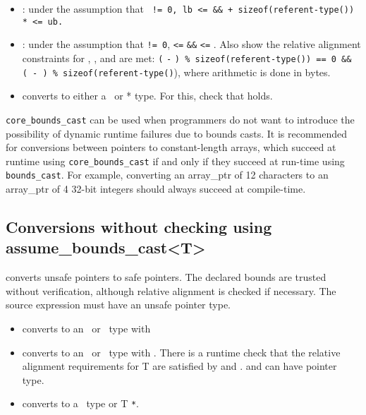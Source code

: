\begin{itemize}
\item
  : under the assumption that 
  \texttt{ != 0, lb <=  \&\& 
          + sizeof(referent-type()) *  <= ub.}
\item
  : 
  under the assumption that
   \texttt{!= 0},  \texttt{<=} 
  \texttt{\&\&}  \texttt{<=} . Also show the
  relative alignment constraints for , , and 
  are met: \texttt{(} \texttt{-} \texttt{) \%
  sizeof(referent-type(}\texttt{)) == 0 \&\& ( - )
  \%
  sizeof(referent-type(}\texttt{)}), where arithmetic is done in
  bytes.
\item
  converts  to either a \ptr\ or * type. For this, check
  that
   holds.
\end{itemize}

\texttt{core\_bounds\_cast} can be used when programmers do not want to
introduce the possibility of dynamic runtime failures due to bounds
casts. It is recommended for conversions between pointers to
constant-length arrays, which succeed at runtime using
\texttt{core\_bounds\_cast} if and only if they succeed at run-time
using \texttt{bounds\_cast}. For example, converting an array\_ptr of 12
characters to an array\_ptr of 4 32-bit integers should always succeed
at compile-time.

\subsection{Conversions without checking using assume\_bounds\_cast\textless{}T\textgreater{}}

converts unsafe pointers to safe pointers. The declared bounds are
trusted without verification, although relative alignment is checked if
necessary. The source expression must have an unsafe pointer type.

\begin{itemize}
\item
  converts  to an \arrayptr\ or
  \arrayview\ type with 
\item
  converts  to an
  \arrayptr\ or \arrayview\ type with .
  There is a runtime check that the relative alignment requirements for
  T are satisfied by   and .  and
   can have pointer type.
\item
  converts  to a \ptr\ type or T \texttt{*}.
\end{itemize}

